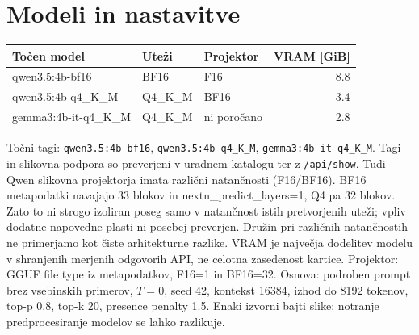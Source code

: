 \documentclass[10pt,a4paper]{article}
\begin{document}
\section*{Modeli in nastavitve}
\begin{center}\small\begin{tabular}{lllr}\toprule
Točen model & Uteži & Projektor & VRAM [GiB] \\ \midrule
qwen3.5:4b-bf16 & BF16 & F16 & 8.8 \\
qwen3.5:4b-q4\_K\_M & Q4\_K\_M & BF16 & 3.4 \\
gemma3:4b-it-q4\_K\_M & Q4\_K\_M & ni poročano & 2.8 \\
\bottomrule\end{tabular}\end{center}

Točni tagi: \texttt{qwen3.5:4b-bf16}, \texttt{qwen3.5:4b-q4\_K\_M}, \texttt{gemma3:4b-it-q4\_K\_M}. Tagi in slikovna podpora so preverjeni v uradnem katalogu ter z \texttt{/api/show}. Tudi Qwen slikovna projektorja imata različni natančnosti (F16/BF16). BF16 metapodatki navajajo 33 blokov in nextn\_predict\_layers=1, Q4 pa 32 blokov. Zato to ni strogo izoliran poseg samo v natančnost istih pretvorjenih uteži; vpliv dodatne napovedne plasti ni posebej preverjen. Družin pri različnih natančnostih ne primerjamo kot čiste arhitekturne razlike.
VRAM je največja dodelitev modelu v shranjenih merjenih odgovorih API, ne celotna zasedenost kartice. Projektor: GGUF file type iz metapodatkov, F16=1 in BF16=32. Osnova: podroben prompt brez vsebinskih primerov, $T=0$, seed 42, kontekst 16384, izhod do 8192 tokenov, top-p 0.8, top-k 20, presence penalty 1.5. Enaki izvorni bajti slike; notranje predprocesiranje modelov se lahko razlikuje.

\newpage
\end{document}
